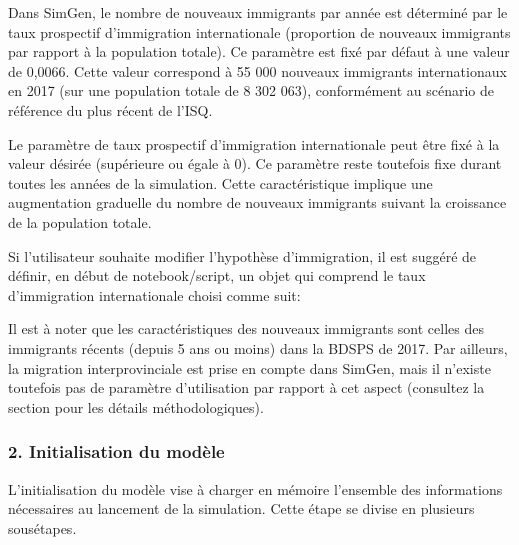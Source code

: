 \documentclass[letterpaper,10pt,french]{sphinxmanual}
\begin{document}
\begin{sphinxVerbatim}[commandchars=\\\{\}]
  
\end{sphinxVerbatim}


Dans SimGen, le nombre de nouveaux immigrants par année est déterminé par le taux prospectif d’immigration internationale
(proportion de nouveaux immigrants par rapport à la population totale).
Ce paramètre est fixé par défaut à une valeur de 0,0066.
Cette valeur correspond à 55 000 nouveaux immigrants internationaux en 2017 (sur une population totale de 8 302 063),
conformément au scénario de référence du plus récent  de l’ISQ.

Le paramètre de taux prospectif d’immigration internationale peut être fixé à la valeur désirée (supérieure ou égale à 0).
Ce paramètre reste toutefois fixe durant toutes les années de la simulation.
Cette caractéristique implique une augmentation graduelle du nombre de nouveaux immigrants suivant la croissance de la population totale.

Si l’utilisateur souhaite modifier l’hypothèse d’immigration, il est suggéré de définir, en début de notebook/script, un objet qui comprend le taux d’immigration internationale choisi comme suit:

\begin{sphinxVerbatim}[commandchars=\\\{\}]
  
\end{sphinxVerbatim}

Il est à noter que les caractéristiques des nouveaux immigrants sont celles des immigrants récents (depuis 5 ans ou moins) dans la BDSPS de 2017.
Par ailleurs, la migration interprovinciale est prise en compte dans SimGen, mais il n’existe toutefois pas de paramètre d’utilisation par rapport à cet aspect
(consultez la section {\hyperref[\detokenize{methodologie:emigration}]{}} pour les détails méthodologiques).


\subsubsection{2. Initialisation du modèle}
\label{\detokenize{utilisation:initialisation-du-modele}}
L’initialisation du modèle vise à charger en mémoire l’ensemble des informations nécessaires au lancement de la simulation.
Cette étape se divise en plusieurs sous\sphinxhyphen{}étapes.
\end{document}
